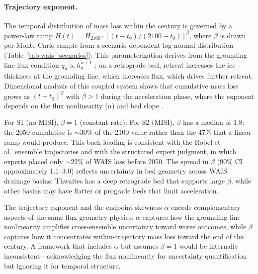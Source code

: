 \documentclass[11pt]{article}
\begin{document}
\paragraph{Trajectory exponent.}
The temporal distribution of mass loss within the century is governed by a power-law ramp $H(t) = H_{2100} \cdot [(t - t_0)/(2100 - t_0)]^\beta$, where $\beta$ is drawn per Monte Carlo sample from a scenario-dependent log-normal distribution (Table~\ref{tab:wais_scenarios}). This parameterization derives from the grounding-line flux condition $q_g \propto h_g^{n+1}$ \citep{Schoof2007}: on a retrograde bed, retreat increases the ice thickness at the grounding line, which increases flux, which drives further retreat. Dimensional analysis of this coupled system shows that cumulative mass loss grows as $(t - t_0)^\beta$ with $\beta > 1$ during the acceleration phase, where the exponent depends on the flux nonlinearity ($n$) and bed slope \citep{Schoof2012, Robel2019}.

For S1 (no MISI), $\beta = 1$ (constant rate). For S2 (MISI), $\beta$ has a median of 1.8: the 2050 cumulative is $\sim\!30\%$ of the 2100 value rather than the $47\%$ that a linear ramp would produce. This back-loading is consistent with the Robel et al.\ ensemble trajectories and with the \citet{Bamber2019} structured expert judgment, in which experts placed only $\sim\!22\%$ of WAIS loss before 2050. The spread in $\beta$ (90\% CI approximately 1.1--3.0) reflects uncertainty in bed geometry across WAIS drainage basins: Thwaites has a deep retrograde bed that supports large $\beta$, while other basins may have flatter or prograde beds that limit acceleration.

The trajectory exponent and the endpoint skewness $\alpha$ encode complementary aspects of the same flux-geometry physics: $\alpha$ captures how the grounding-line nonlinearity amplifies cross-ensemble uncertainty toward worse outcomes, while $\beta$ captures how it concentrates within-trajectory mass loss toward the end of the century. A framework that includes $\alpha$ but assumes $\beta = 1$ would be internally inconsistent---acknowledging the flux nonlinearity for uncertainty quantification but ignoring it for temporal structure.
\end{document}

